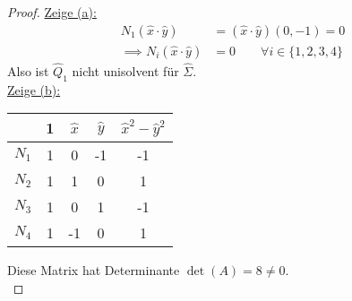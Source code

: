 \documentclass[12pt,a4paper]{article}
\begin{document}
\begin{proof}
\underline{Zeige (a):}\\
\begin{align*}
N_1(\hat{x}\cdot\hat{y})&=(\hat{x}\cdot\hat{y})(0,-1)=0\\
\implies N_i(\hat{x}\cdot\hat{y})&=0\qquad\forall i\in\lbrace1,2,3,4\rbrace
\end{align*}
Also ist $\hat{Q}_1$ nicht unisolvent für $\hat{\Sigma}$.\\

\underline{Zeige (b):}\\
\begin{tabular}{c|cccc}
& 1 & $\hat{x}$ & $\hat{y}$ & $\hat{x}^2-\hat{y}^2$\\ \hline
$N_1$ & 1 & 0 & -1 & -1\\
$N_2$ & 1 & 1 & 0 & 1\\
$N_3$ & 1 & 0 & 1 & -1\\
$N_4$ & 1 & -1 & 0 & 1
\end{tabular}
Diese Matrix hat Determinante $\det(A)=8\neq0$.\\


\end{proof}
\end{document}
